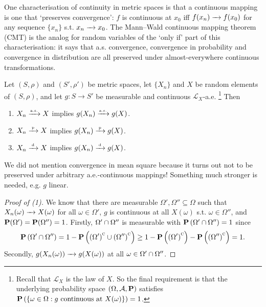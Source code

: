 \documentclass[11pt,letterpaper,reqno,oneside]{article}
\begin{document}
One characterisation of continuity in metric spaces is that a continuous mapping is one that `preserves convergence': $f$ is continuous at $x_0$ iff $f(x_n) \xrightarrow{\;\;\;} f(x_0)$ for any sequence $\{ x_n \}$ s.t. $x_n \xrightarrow{\;\;\;} x_0$. The Mann--Wald continuous mapping theorem (CMT) is the analog for random variables of the `only if' part of this characterisation: it says that a.s. convergence, convergence in probability and convergence in distribution are all preserved under almost-everywhere continuous transformations.
%
\begin{theorem}
	\label{theorem:Mann--Wald_CMT}
	Let $(S,\rho)$ and $(S',\rho')$ be metric spaces, let $\{ X_n \}$ and $X$ be random elements of $(S,\rho)$, and let $g : S \to S'$ be measurable and continuous $\mathcal{L}_X$-a.e.%
		\footnote{Recall that $\mathcal{L}_X$ is the law of $X$. So the final requirement is that the underlying probability space $(\Omega,\mathcal{A},\mathbf{P})$ satisfies $\mathbf{P}\left(\left\{ \omega \in \Omega : \text{$g$ continuous at $X(\omega)$} \right\}\right)=1$.}
	Then
	\begin{enumerate}

		\item $X_n \xrightarrow{{\scriptscriptstyle \mathrm{a.s.}}} X$ implies $g(X_n) \xrightarrow{{\scriptscriptstyle \mathrm{a.s.}}} g(X)$.

		\item $X_n \xrightarrow{{\scriptscriptstyle \mathrm{\;p\;}}} X$ implies $g(X_n) \xrightarrow{{\scriptscriptstyle \mathrm{\;p\;}}} g(X)$.

		\item $X_n \xrightarrow{{\scriptscriptstyle \mathrm{\;d\;}}} X$ implies $g(X_n) \xrightarrow{{\scriptscriptstyle \mathrm{\;d\;}}} g(X)$.

	\end{enumerate}
\end{theorem}


\begin{remark}
	We did not mention convergence in mean square because it turns out not to be preserved under arbitrary a.e.-continuous mappings! Something much stronger is needed, e.g. $g$ linear.
\end{remark}


\begin{proof}[Proof of (1)]
	We know that there are measurable $\Omega',\Omega'' \subseteq \Omega$ such that $X_n(\omega) \xrightarrow{\;\;\;} X(\omega)$ for all $\omega \in \Omega'$, $g$ is continuous at all $X(\omega)$ s.t. $\omega \in \Omega''$, and $\mathbf{P}(\Omega')=\mathbf{P}(\Omega'')=1$. Firstly, $\Omega' \cap \Omega''$ is measurable with $\mathbf{P}\left( \Omega' \cap \Omega'' \right) = 1$ since
	\begin{equation*}
		\mathbf{P}\left( \Omega' \cap \Omega'' \right)
		= 1 - \mathbf{P}\left( \left( \Omega' \right)^{\textsc{c}} 
		\cup \left( \Omega'' \right)^{\textsc{c}} \right)
		\geq 1 - \mathbf{P}\left( \left( \Omega' \right)^{\textsc{c}} \right)
		- \mathbf{P}\left( \left( \Omega'' \right)^{\textsc{c}} \right)
		= 1 .
	\end{equation*}
	Secondly, $g(X_n(\omega)) \xrightarrow{\;\;\;} g(X(\omega))$ at all $\omega \in \Omega' \cap \Omega''$.
\end{proof}
\end{document}
